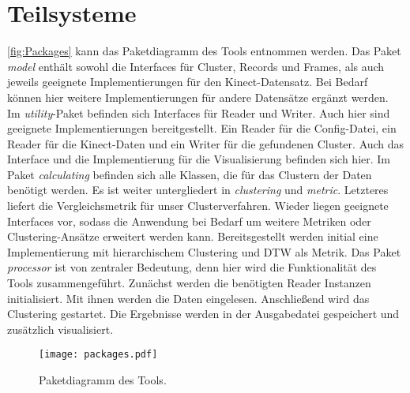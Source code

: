 \section{Teilsysteme}
\label{4-Teilsysteme}
\autoref{fig:Packages} kann das Paketdiagramm des Tools entnommen werden.
Das Paket \emph{model} enthält sowohl die Interfaces für Cluster, Records und Frames,
als auch jeweils geeignete Implementierungen für den Kinect-Datensatz.
Bei Bedarf können hier weitere Implementierungen für andere Datensätze ergänzt werden.
Im \emph{utility}-Paket befinden sich Interfaces für Reader und Writer.
Auch hier sind geeignete Implementierungen bereitgestellt.
Ein Reader für die Config-Datei, ein Reader für die Kinect-Daten
und ein Writer für die gefundenen Cluster.
Auch das Interface und die Implementierung für die Visualisierung befinden sich hier.
Im Paket \emph{calculating} befinden sich alle Klassen, die für das Clustern der Daten benötigt werden.
Es ist weiter untergliedert in \emph{clustering} und \emph{metric}.
Letzteres liefert die Vergleichsmetrik für unser Clusterverfahren.
Wieder liegen geeignete Interfaces vor,
sodass die Anwendung bei Bedarf um weitere Metriken oder Clustering-Ansätze erweitert werden kann.
Bereitsgestellt werden initial eine Implementierung mit hierarchischem Clustering
und \ac{DTW} als Metrik.
Das Paket \emph{processor} ist von zentraler Bedeutung,
denn hier wird die Funktionalität des Tools zusammengeführt.
Zunächst werden die benötigten Reader Instanzen initialisiert.
Mit ihnen werden die Daten eingelesen.
Anschließend wird das Clustering gestartet.
Die Ergebnisse werden in der Ausgabedatei gespeichert und zusätzlich visualisiert.
\begin{figure}[ht]
    \begin{center}
    \texttt{[image: packages.pdf]}
    \end{center}
    \caption{Paketdiagramm des Tools.}
    \label{fig:Packages}
\end{figure}

\clearpage
